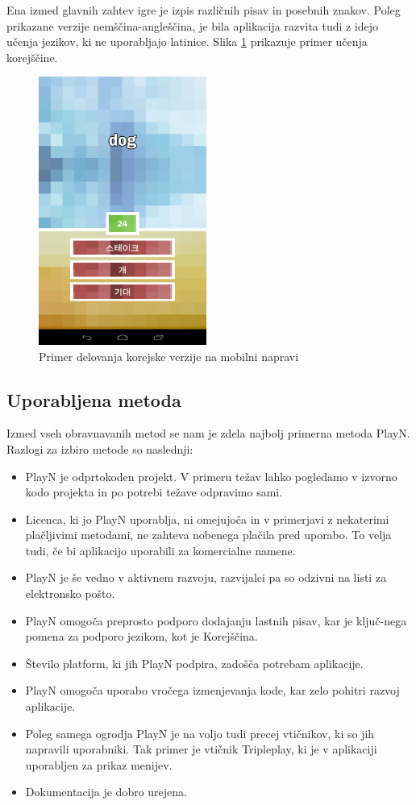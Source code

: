 Ena izmed glavnih zahtev igre je izpis različnih pisav in posebnih znakov. Poleg prikazane verzije nemščina-angleščina, je bila aplikacija razvita tudi z idejo učenja jezikov, ki ne uporabljajo latinice. Slika \ref{korean} prikazuje primer učenja korejščine. 

\begin{figure}
\begin{center}
\includegraphics[width=5.5cm]{pic/defg-korean.png}
\end{center}
\caption{Primer delovanja korejske verzije na mobilni napravi}
\label{korean}
\end{figure} 

\subsection{Uporabljena metoda}

Izmed vseh obravnavanih metod se nam je zdela najbolj primerna metoda PlayN. Razlogi za izbiro metode so naslednji:

\begin{itemize}
\item PlayN je odprtokoden projekt. V primeru težav lahko pogledamo v izvorno kodo projekta in po potrebi težave odpravimo sami.
\item Licenca, ki jo PlayN uporablja, ni omejujoča in v primerjavi z nekaterimi plačljivimi metodami, ne zahteva nobenega plačila pred uporabo. To velja tudi, če bi aplikacijo uporabili za komercialne namene.
\item PlayN je še vedno v aktivnem razvoju, razvijalci pa so odzivni na listi za elektronsko pošto.
\item PlayN omogoča preprosto podporo dodajanju lastnih pisav, kar je ključ-nega pomena za podporo jezikom, kot je Korejščina.
\item Število platform, ki jih PlayN podpira, zadošča potrebam aplikacije.
\item PlayN omogoča uporabo vročega izmenjevanja kode, kar zelo pohitri razvoj aplikacije.
\item Poleg samega ogrodja PlayN je na voljo tudi precej vtičnikov, ki so jih napravili uporabniki. Tak primer je vtičnik Tripleplay, ki je v aplikaciji uporabljen za prikaz menijev.
\item Dokumentacija je dobro urejena.
\end{itemize}

